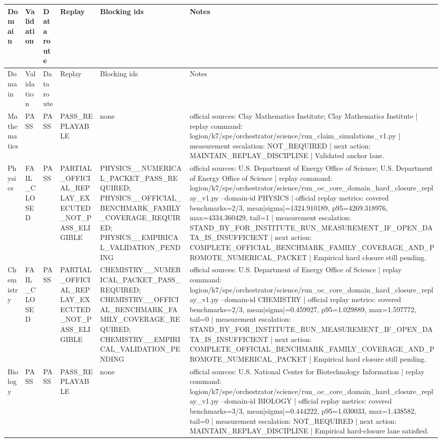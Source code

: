 \begin{longtable}{p{}p{}p{}p{}p{}p{}}
\toprule
Domain & Validation & Data route & Replay & Blocking ids & Notes \\
\midrule
\endfirsthead
\toprule
Domain & Validation & Data route & Replay & Blocking ids & Notes \\
\midrule
\endhead
Mathematics & PASS & PASS & PASS\_REPLAYABLE & none & official sources: Clay Mathematics Institute; Clay Mathematics Institute | replay command: logion/k7/spe/orchestrator/science/run\_claim\_simulations\_v1.py | measurement escalation: NOT\_REQUIRED | next action: MAINTAIN\_REPLAY\_DISCIPLINE | Validated anchor lane. \\
Physics & FAIL\_CLOSED & PASS & PARTIAL\_OFFICIAL\_REPLAY\_EXECUTED\_NOT\_PASS\_ELIGIBLE & PHYSICS\_\_NUMERICAL\_PACKET\_PASS\_REQUIRED; PHYSICS\_\_OFFICIAL\_BENCHMARK\_FAMILY\_COVERAGE\_REQUIRED; PHYSICS\_\_EMPIRICAL\_VALIDATION\_PENDING & official sources: U.S. Department of Energy Office of Science; U.S. Department of Energy Office of Science | replay command: logion/k7/spe/orchestrator/science/run\_oc\_core\_domain\_hard\_closure\_replay\_v1.py --domain-id PHYSICS | official replay metrics: covered benchmarks=2/3, mean|sigma|=1324.910189, p95=4269.318976, max=4334.360429, tail=1 | measurement escalation: STAND\_BY\_FOR\_INSTITUTE\_RUN\_MEASUREMENT\_IF\_OPEN\_DATA\_IS\_INSUFFICIENT | next action: COMPLETE\_OFFICIAL\_BENCHMARK\_FAMILY\_COVERAGE\_AND\_PROMOTE\_NUMERICAL\_PACKET | Empirical hard closure still pending. \\
Chemistry & FAIL\_CLOSED & PASS & PARTIAL\_OFFICIAL\_REPLAY\_EXECUTED\_NOT\_PASS\_ELIGIBLE & CHEMISTRY\_\_NUMERICAL\_PACKET\_PASS\_REQUIRED; CHEMISTRY\_\_OFFICIAL\_BENCHMARK\_FAMILY\_COVERAGE\_REQUIRED; CHEMISTRY\_\_EMPIRICAL\_VALIDATION\_PENDING & official sources: U.S. Department of Energy Office of Science | replay command: logion/k7/spe/orchestrator/science/run\_oc\_core\_domain\_hard\_closure\_replay\_v1.py --domain-id CHEMISTRY | official replay metrics: covered benchmarks=2/3, mean|sigma|=0.459927, p95=1.029889, max=1.597772, tail=0 | measurement escalation: STAND\_BY\_FOR\_INSTITUTE\_RUN\_MEASUREMENT\_IF\_OPEN\_DATA\_IS\_INSUFFICIENT | next action: COMPLETE\_OFFICIAL\_BENCHMARK\_FAMILY\_COVERAGE\_AND\_PROMOTE\_NUMERICAL\_PACKET | Empirical hard closure still pending. \\
Biology & PASS & PASS & PASS\_REPLAYABLE & none & official sources: U.S. National Center for Biotechnology Information | replay command: logion/k7/spe/orchestrator/science/run\_oc\_core\_domain\_hard\_closure\_replay\_v1.py --domain-id BIOLOGY | official replay metrics: covered benchmarks=3/3, mean|sigma|=0.444222, p95=1.030033, max=1.438582, tail=0 | measurement escalation: NOT\_REQUIRED | next action: MAINTAIN\_REPLAY\_DISCIPLINE | Empirical hard-closure lane satisfied. \\

\end{longtable}

